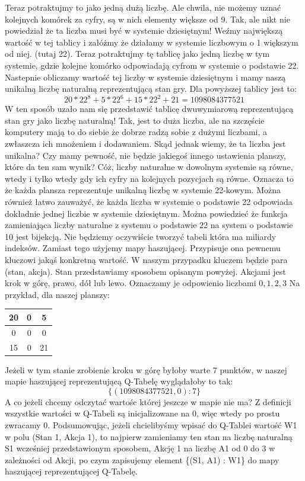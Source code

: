 \documentclass[a4paper,12pt]{article}
\begin{document}
Teraz potraktujmy to jako jedną dużą liczbę. Ale chwila, nie możemy uznać kolejnych komórek za cyfry, są w nich elementy większe od 9. Tak, ale nikt nie powiedział że ta liczba musi być w systemie dziesiętnym! Weźmy największą wartość w tej tablicy i załóżmy że działamy w systemie liczbowym o 1 większym od niej. (tutaj 22). Teraz potraktujmy tę tablicę jako jedną liczbę w tym systemie, gdzie kolejne komórko odpowiadają cyfrom w systemie o podstawie 22. Nastepnie obliczamy wartość tej liczby w systemie dziesiętnym i mamy naszą unikalną liczbę naturalną reprezentującą stan gry. Dla powyższej tablicy jest to:
\[20*22^8 + 5*22^6 + 15*22^2 + 21 = 1098084377521\]
W ten sposób uzało nam się przedstawić tablicę dwuwymiarową reprezentującą stan gry jako liczbę naturalną! Tak, jest to duża liczba, ale na szczęście komputery mają to do siebie że dobrze radzą sobie z dużymi liczbami, a zwłaszcza ich mnożeniem i dodawaniem.
\newline \newline Skąd jednak wiemy, że ta liczba jest unikalna? Czy mamy pewność, nie będzie jakiegoś innego ustawienia planszy, które da ten sam wynik? Cóż, liczby naturalne w dowolnym systemie są równe, wtedy i tylko wtedy gdy ich cyfry na kolejnych pozycjach są równe. Oznacza to że każda plansza reprezentuje unikalną liczbę w systemie 22-kowym. Można również łatwo zauważyć, że każda liczba w systemie o podstawie 22 odpowiada dokładnie jednej liczbie w systemie dziesiętnym. Można powiedzieć że funkcja zamieniająca liczby naturalne z systemu o podstawie 22 na system o podstawie 10 jest bijekcją.
\newline \newline Nie będziemy oczywiście tworzyć tabeli która ma miliardy indeksów. Zamiast tego użyjemy mapy haszującej. Przypisuje ona pewnemu kluczowi jakąś konkretną wartość. W naszym przypadku kluczem będzie para (stan, akcja). Stan przedstawiamy sposobem opisanym powyżej. Akcjami jest krok w górę, prawo, dół lub lewo. Oznaczamy je odpowienio liczbami \(0, 1, 2, 3\)
Na przykład, dla naszej planszy:
\begin{center}
\begin{tabular}{ |c|c|c| }
\hline
20 & 0 & 5 \\
\hline
0 & 0 & 0 \\
\hline
15 & 0 & 21 \\
\hline
\end{tabular}
\end{center} 
Jeżeli w tym stanie zrobienie kroku w górę byłoby warte 7 punktów, w naszej mapie haszującej reprezentującą Q-Tabelę wyglądałoby to tak:
\[\{ (1098084377521, 0) : 7 \}\]
A co jeżeli chcemy odczytać wartośc której jeszcze w mapie nie ma? Z definicji wszystkie wartości w Q-Tabeli są inicjalizowane na 0, więc wtedy po prostu zwracamy 0.
\newline \newline Podsumowując, jeżeli chcielibyśmy wpisać do Q-Tablei wartość W1 w polu (Stan 1, Akcja 1), to najpierw zamieniamy ten stan na liczbę naturalną S1 wcześniej przedstawionym sposobem, Akcję 1 na liczbę A1 od 0 do 3 w zależności od Akcji, po czym zapisujemy element \{(S1, A1) :  W1\} do mapy haszującej reprezentującej Q-Tabelę.
\end{document}

